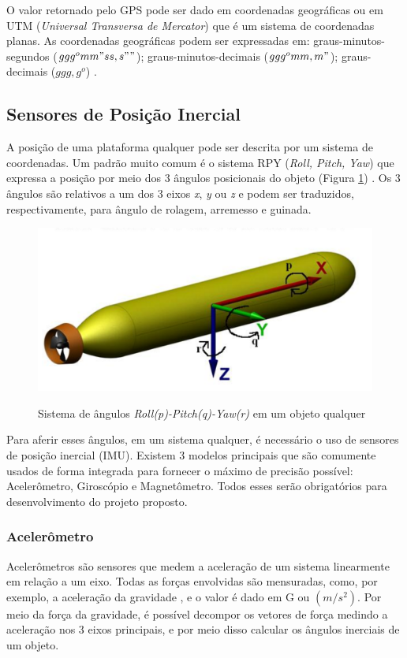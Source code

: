 O valor retornado pelo GPS pode ser dado em coordenadas geográficas ou em UTM (\textit{Universal Transversa de Mercator}) que é um sistema de coordenadas planas. As coordenadas geográficas podem ser expressadas em: graus-minutos-segundos ($ ggg^o mm" ss,s"" $); graus-minutos-decimais ($ ggg^o mm,m" $); graus-decimais ($ ggg,g^o $) \cite{apostilagps}. 


\subsection{Sensores de Posição Inercial}

A posição de uma plataforma qualquer pode ser descrita por um sistema de coordenadas. Um padrão muito comum é o sistema RPY (\textit{Roll, Pitch, Yaw}) que expressa a posição por meio dos 3 ângulos posicionais do objeto (Figura \ref{fig:RPY}) \cite{diss:FabioAUV}. Os 3 ângulos são relativos a um dos 3 eixos \textit{x}, \textit{y} ou \textit{z} e podem ser traduzidos, respectivamente, para ângulo de rolagem, arremesso e guinada.

\begin{figure}[!htb]
	\centering
	\caption{Sistema de ângulos \textit{Roll(p)-Pitch(q)-Yaw(r)} em um objeto qualquer}
	\includegraphics[width=0.7\linewidth]{figuras/coordenadasRPY}
	\label{fig:RPY}
\end{figure}

Para aferir esses ângulos, em um sistema qualquer, é necessário o uso de sensores de posição inercial (IMU). Existem 3 modelos principais que são comumente usados de forma integrada para fornecer o máximo de precisão possível: Acelerômetro, Giroscópio e Magnetômetro. Todos esses serão obrigatórios para desenvolvimento do projeto proposto.

\subsubsection{Acelerômetro}

Acelerômetros são sensores que medem a aceleração de um sistema linearmente em relação a um eixo. Todas as forças envolvidas são mensuradas, como, por exemplo, a aceleração da gravidade \cite{diss:FabioAUV}, e o valor é dado em G ou $ (m/s^2) $. Por meio da força da gravidade, é possível decompor os vetores de força medindo a aceleração nos 3 eixos principais, e por meio disso calcular os ângulos inerciais de um objeto.


